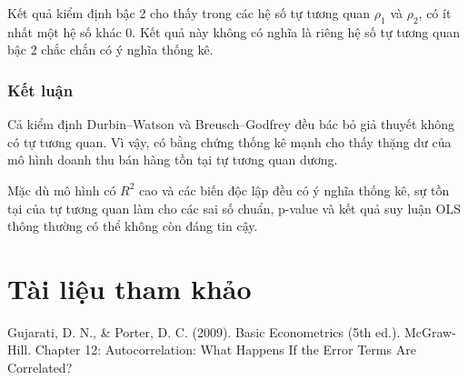 \documentclass[12pt,a4paper]{article}
\begin{document}
Kết quả kiểm định bậc 2 cho thấy trong các hệ số tự tương quan
$\rho_1$ và $\rho_2$, có ít nhất một hệ số khác $0$. Kết quả này không
có nghĩa là riêng hệ số tự tương quan bậc 2 chắc chắn có ý nghĩa thống kê.

\subsubsection{Kết luận}

Cả kiểm định Durbin--Watson và Breusch--Godfrey đều bác bỏ giả thuyết
không có tự tương quan. Vì vậy, có bằng chứng thống kê mạnh cho thấy
thặng dư của mô hình doanh thu bán hàng tồn tại tự tương quan dương.

Mặc dù mô hình có $R^2$ cao và các biến độc lập đều có ý nghĩa thống kê,
sự tồn tại của tự tương quan làm cho các sai số chuẩn, p-value và kết quả
suy luận OLS thông thường có thể không còn đáng tin cậy.

\section{Tài liệu tham khảo}\label{tuxe0i-liux1ec7u-tham-khux1ea3o}

Gujarati, D. N., \& Porter, D. C. (2009). Basic Econometrics (5th ed.).
McGraw-Hill. Chapter 12: Autocorrelation: What Happens If the Error
Terms Are Correlated?
\end{document}
